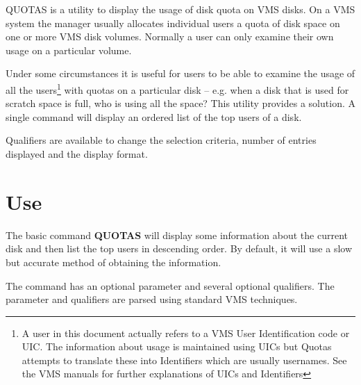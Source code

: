 QUOTAS is a utility to display the usage of disk quota on VMS disks.
On a VMS system the manager usually allocates individual users a quota
of disk space on one or more VMS disk volumes.
Normally a user can only examine their own usage on a particular volume.

Under some circumstances it is useful for users to be able to examine the
usage of all the users\footnote{
 A user in this document actually refers to a VMS User Identification code
 or UIC.
The information about usage is maintained using UICs but Quotas attempts to
translate these into Identifiers which are usually usernames.
See the VMS manuals for further explanations of UICs and Identifiers}
with quotas on a particular disk -- e.g. when a
disk that is used for scratch space is full, who is using all the space?
This utility provides a solution.
A single command will display an ordered list of the top users of a
disk.

Qualifiers are available to change the selection criteria, number of entries
displayed and the display format.

\section{Use}

The basic command {\bf QUOTAS} will display some information about the
current disk and then list the top users in descending order. By default,
it will use a slow but accurate method of obtaining the information.

The command has an optional parameter and several optional qualifiers.
The parameter and qualifiers are parsed using standard VMS techniques.

